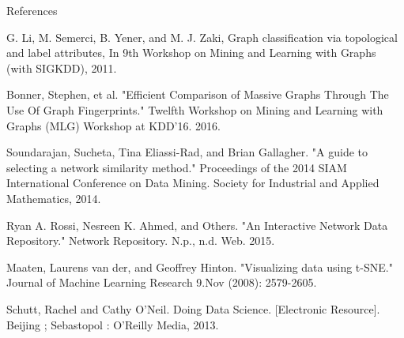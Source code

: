 \documentclass{beamer}
\begin{document}
\begin{frame}{References}
    \begin{itemize}
    \scriptsize{
        \item G. Li, M. Semerci, B. Yener, and M. J. Zaki, Graph classification via topological and label attributes, In 9th Workshop on Mining and Learning with Graphs (with SIGKDD), 2011.
        \item Bonner, Stephen, et al. "Efficient Comparison of Massive Graphs Through The Use Of Graph Fingerprints." Twelfth Workshop on Mining and Learning with Graphs (MLG) Workshop at KDD’16. 2016.
        \item Soundarajan, Sucheta, Tina Eliassi-Rad, and Brian Gallagher. "A guide to selecting a network similarity method." Proceedings of the 2014 SIAM International Conference on Data Mining. Society for Industrial and Applied Mathematics, 2014.
        \item Ryan A. Rossi, Nesreen K. Ahmed, and Others. "An Interactive Network Data Repository." Network Repository. N.p., n.d. Web. 2015.
        \item Maaten, Laurens van der, and Geoffrey Hinton. "Visualizing data using t-SNE." Journal of Machine Learning Research 9.Nov (2008): 2579-2605.
        \item Schutt, Rachel and Cathy O'Neil. Doing Data Science. [Electronic Resource]. Beijing ; Sebastopol : O'Reilly Media, 2013. %
        }
    \end{itemize}
\end{frame}
\end{document}
